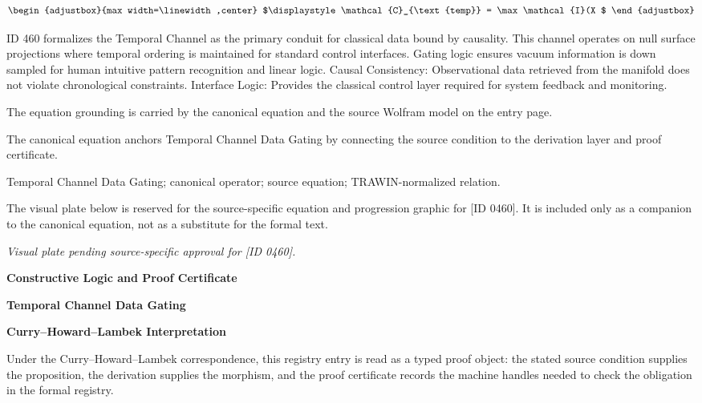 \[
\begin{adjustbox}{max width=\linewidth,center}
$\displaystyle
\mathcal{C}_{\text{temp}} = \max \mathcal{I}(X
$
\end{adjustbox}
\]

ID 460 formalizes the Temporal Channel as the primary conduit for classical data bound by causality. This channel operates on null surface projections where temporal ordering is maintained for standard control interfaces. Gating logic ensures vacuum information is down sampled for human intuitive pattern recognition and linear logic. Causal Consistency: Observational data retrieved from the manifold does not violate chronological constraints. Interface Logic: Provides the classical control layer required for system feedback and monitoring.

The equation grounding is carried by the canonical equation and the source Wolfram model on the entry page.

The canonical equation anchors Temporal Channel Data Gating by connecting the source condition to the derivation layer and proof certificate.

Temporal Channel Data Gating; canonical operator; source equation; TRAWIN-normalized relation.
\endgroup

\begingroup\footnotesize\sloppy
The visual plate below is reserved for the source-specific equation and progression graphic for [ID 0460]. It is included only as a companion to the canonical equation, not as a substitute for the formal text.
\par\endgroup
\begingroup\footnotesize\itshape
Visual plate pending source-specific approval for [ID 0460].
\par\endgroup

\clearpage
\begingroup\tzpsupportsetup
\noindent\textbf{\fontsize{10.8pt}{12.8pt}\selectfont [ID 0460] Constructive Logic and Proof Certificate}\par
\noindent\textbf{\fontsize{10pt}{12pt}\selectfont Temporal Channel Data Gating}\par
\vspace{0.45em}
\begingroup
\footnotesize
\setlength{\parskip}{0.22em}
\setlength{\parindent}{0pt}
\noindent\textbf{Curry--Howard--Lambek Interpretation}\par
Under the Curry--Howard--Lambek correspondence, this registry entry is read as a typed proof
object: the stated source condition supplies the proposition, the derivation supplies the
morphism, and the proof certificate records the machine handles needed to check the obligation
in the formal registry.

